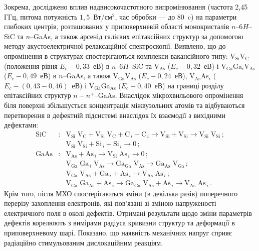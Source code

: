 Зокрема, досліджено вплив надвисокочастотного випромінювання (частота 2,45 ГГц, питома потужність  $1,5$~Вт/см$^2$, час обробки --- до 80~c) на параметри глибоких центрів, розташованих у приповерхневій області монокристалів $n$--6$H$--SiC та $n$--GaAs, а також арсенід галієвих епітаксійних структур за допомогою методу акустоелектричної релаксаційної спектроскопії.
Виявлено, що до опромінення в структурах спостерігаються комплекси вакансійного типу:
%
V$_\text{Si}$V$_\text{C}$ (положення рівня $E_c-0,33$~еВ) в $n$--6$H$--SiC
та V$_\text{As}$ ($E_c-0,32$~еВ) і V$_\text{Ga}$Ga$_i$V$_\text{As}$ ($E_c-0,49$~еВ) в $n$--GaAs,
а також V$_\text{Ga}$V$_\text{As}$ ($E_c-0,24$~еВ), V$_\text{As}$As$_i$ ($E_c-(0,43-0,46)$~еВ) і
 V$_\text{Ga}$Ga$_\text{As}$ ($E_c-0,40$~еВ) на границі розділу епітаксійних структур $n-n^+$--GaAs.
Внаслідок мікрохвильового опромінення біля поверхні збільшується концентрація міжвузольних атомів та відбуваються перетворення в дефектній
підсистемі внаслідок їх взаємодії з вихідними дефектами:
\begin{eqnarray*}
  \text{SiC}&:&\text{V}_\text{Si}\;\text{V}_\text{C}+\text{V}_\text{Si}\;\text{V}_\text{C}+\text{C}_{\,i}+ \text{C}_{\,i} \rightarrow \text{V}_\text{Si}+ \text{V}_\text{Si}\rightarrow \text{V}_\text{Si}\;\text{V}_\text{Si}\,;\\
  &&\text{V}_\text{Si}\;\text{V}_\text{Si}+\text{Si}_{\,i}+ \text{Si}_{\,i} \rightarrow 0\,;\\
  \text{GaAs}&:&\text{V}_\text{As}+ \text{As}_{\,i} \rightarrow\text{V}_\text{Si}\;\text{As}_{\,i} \rightarrow 0\,;\\
   &&  \text{V}_\text{Ga}\;\text{Ga}_{\,i}\;\text{V}_\text{As}\rightarrow \text{Ga}_\text{Ga}\;\text{V}_\text{As}
  \rightarrow \text{Ga}_\text{As}\;\text{V}_\text{Ga} \,;\\
  &&\text{V}_\text{Ga}\;\text{V}_\text{As}+\text{Ga}_{\,i}+\text{As}_{\,i} \rightarrow \text{V}_\text{As}\;\text{As}_{\,i}\,;\\
  &&  \text{V}_\text{Ga}\;\text{Ga}_\text{As}+\text{As}_{\,i} \rightarrow
  \text{Ga}_\text{Ga}\;\text{V}_\text{As}+\text{As}_{\,i} \rightarrow
  \text{V}_\text{As}\;\text{As}_{\,i}\,.
\end{eqnarray*}
Крім того, після МХО спостерігаються зміни (в декілька разів) поперечного перерізу захоплення електронів,
які пов'язані зі зміною напруженості електричного поля в околі дефектів.
Отримані результати щодо зміни параметрів дефектів корелюють з вимірами радіуса кривизни структур та деформації в приповерхневому шарі.
Показано, що наявність механічних напруг сприяє радіаційно стимульованим дислокаційним реакціям.


